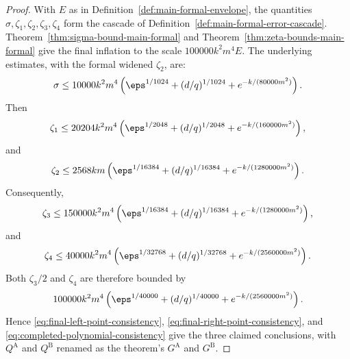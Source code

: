 \begin{proof}
	With $E$ as in Definition~\ref{def:main-formal-envelope}, the quantities $\sigma,\zeta_1,\zeta_2,\zeta_3,\zeta_4$ form the cascade of Definition~\ref{def:main-formal-error-cascade}. Theorem~\ref{thm:sigma-bound-main-formal} and Theorem~\ref{thm:zeta-bounds-main-formal} give the final inflation to the scale $100000k^2m^4 E$. The underlying estimates, with the formal widened $\zeta_2$, are:
	\[
		\sigma \le 10000k^2m^4\left(\eps^{1/1024}+(d/q)^{1/1024}+e^{-k/(80000m^2)}\right).
	\]
	Then
	\[
		\zeta_1 \le 20204k^2m^4\left(\eps^{1/2048}+(d/q)^{1/2048}+e^{-k/(160000m^2)}\right),
	\]
	and
	\[
		\zeta_2 \le 2568km\left(\eps^{1/16384}+(d/q)^{1/16384}+e^{-k/(1280000m^2)}\right).
	\]
	Consequently,
	\[
		\zeta_3 \le 150000k^2m^4\left(\eps^{1/16384}+(d/q)^{1/16384}+e^{-k/(1280000m^2)}\right),
	\]
	and
	\[
		\zeta_4 \le 40000k^2m^4\left(\eps^{1/32768}+(d/q)^{1/32768}+e^{-k/(2560000m^2)}\right).
	\]
	Both $\zeta_3/2$ and $\zeta_4$ are therefore bounded by
	\[
		100000k^2m^4\left(\eps^{1/40000}+(d/q)^{1/40000}+e^{-k/(2560000m^2)}\right).
	\]
	Hence \ref{eq:final-left-point-consistency}, \ref{eq:final-right-point-consistency}, and \ref{eq:completed-polynomial-consistency} give the three claimed conclusions, with $Q^{\mathrm A}$ and $Q^{\mathrm B}$ renamed as the theorem's $G^{\mathrm A}$ and $G^{\mathrm B}$.
\end{proof}













